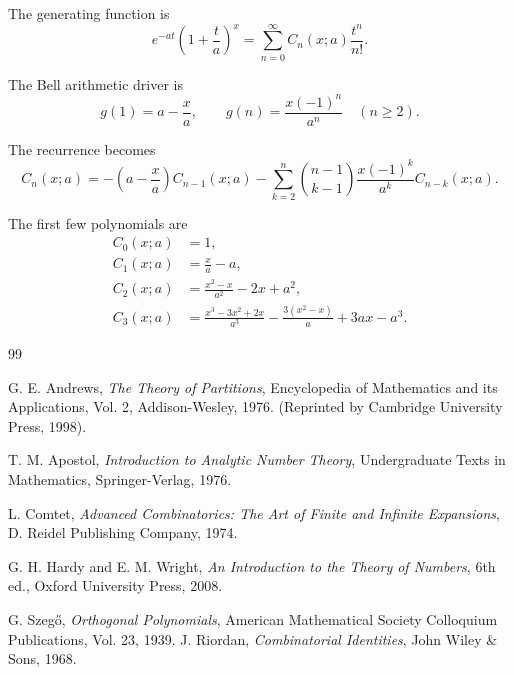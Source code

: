\documentclass[11pt, a4paper]{article}
\theoremstyle{remark}
\begin{document}
The generating function is
\[
e^{-at}
\left(
1+\frac{t}{a}
\right)^x
=
\sum_{n=0}^{\infty}
C_n(x;a)\frac{t^n}{n!}.
\]

The Bell arithmetic driver is
\[
g(1)=a-\frac xa,
\qquad
g(n)=\frac{x(-1)^n}{a^n}
\quad(n\ge2).
\]

The recurrence becomes
\[
\boxed{
C_n(x;a)
=
-\left(a-\frac xa\right)C_{n-1}(x;a)
-
\sum_{k=2}^n
\binom{n-1}{k-1}
\frac{x(-1)^k}{a^k}
C_{n-k}(x;a).
}
\]

The first few polynomials are
\[
\begin{aligned}
C_0(x;a)&=1,\\
C_1(x;a)&=\frac{x}{a}-a,\\
C_2(x;a)&=
\frac{x^2-x}{a^2}
-2x+a^2,\\
C_3(x;a)&=
\frac{x^3-3x^2+2x}{a^3}
-\frac{3(x^2-x)}a
+3ax-a^3.
\end{aligned}
\]
\begin{thebibliography}{99}

G. E. Andrews, \emph{The Theory of Partitions}, Encyclopedia of Mathematics and its Applications, Vol. 2, Addison-Wesley, 1976. (Reprinted by Cambridge University Press, 1998).

T. M. Apostol, \emph{Introduction to Analytic Number Theory}, Undergraduate Texts in Mathematics, Springer-Verlag, 1976.

L. Comtet, \emph{Advanced Combinatorics: The Art of Finite and Infinite Expansions}, D. Reidel Publishing Company, 1974.

G. H. Hardy and E. M. Wright, \emph{An Introduction to the Theory of Numbers}, 6th ed., Oxford University Press, 2008.


G. Szeg\H{o}, \emph{Orthogonal Polynomials}, American Mathematical Society Colloquium Publications, Vol. 23, 1939.
J. Riordan,
\emph{Combinatorial Identities},
John Wiley \& Sons, 1968.



\end{thebibliography}
\end{document}
